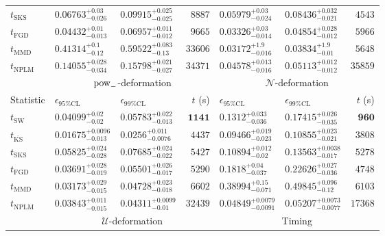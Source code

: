 \begin{tabular}{l|llr|llr}
	$t_{\mathrm{SKS}}$ & $0.06763_{-0.026}^{+0.03}$ & $0.09915_{-0.025}^{+0.025}$ & $8887$ & $0.05979_{-0.024}^{+0.03}$ & $0.08436_{-0.021}^{+0.032}$ & $4543$ \\
	$t_{\mathrm{FGD}}$ & ${\mathbf{0.04432_{-0.013}^{+0.01}}}$ & ${\mathbf{0.06957_{-0.012}^{+0.011}}}$ & $9665$ & $0.03326_{-0.014}^{+0.03}$ & $0.04854_{-0.012}^{+0.028}$ & $5966$ \\
	$t_{\mathrm{MMD}}$ & $0.41314_{-0.12}^{+0.1}$ & $0.59522_{-0.13}^{+0.083}$ & $33606$ & $0.03172_{-0.016}^{+1.9}$ & $0.03834_{-0.01}^{+1.9}$ & $5648$ \\
\rowcolor{red!35}	$t_{\mathrm{NPLM}}$ & $0.14055_{-0.034}^{+0.028}$ & $0.15798_{-0.027}^{+0.021}$ & $34371$ & $0.04578_{-0.016}^{+0.013}$ & $0.05113_{-0.012}^{+0.012}$ & $35859$ \\
	\toprule
	\multicolumn{1}{c}{} & \multicolumn{3}{c}{$\rm{pow}_{-}$-deformation} & \multicolumn{3}{c}{$\mathcal{N}$-deformation} \\
Statistic & $\epsilon_{95\%\mathrm{CL}}$ & $\epsilon_{99\%\mathrm{CL}}$ & $t$ (s) & $\epsilon_{95\%\mathrm{CL}}$ & $\epsilon_{99\%\mathrm{CL}}$ & $t$ (s) \\
	\midrule
	$t_{\mathrm{SW}}$ & $0.04099_{-0.02}^{+0.02}$ & $0.05783_{-0.013}^{+0.022}$ & ${\mathbf{1141}}$ & $0.1312_{-0.036}^{+0.033}$ & $0.17415_{-0.035}^{+0.026}$ & ${\mathbf{960}}$ \\
	$t_{\overline{\mathrm{KS}}}$ & ${\mathbf{0.01675_{-0.013}^{+0.0096}}}$ & ${\mathbf{0.0256_{-0.0076}^{+0.011}}}$ & $4437$ & ${\mathbf{0.09466_{-0.023}^{+0.019}}}$ & ${\mathbf{0.10855_{-0.021}^{+0.023}}}$ & $3808$ \\
	$t_{\mathrm{SKS}}$ & $0.05825_{-0.028}^{+0.024}$ & $0.07685_{-0.022}^{+0.024}$ & $5427$ & $0.10894_{-0.02}^{+0.012}$ & $0.13563_{-0.017}^{+0.0038}$ & $5278$ \\
	$t_{\mathrm{FGD}}$ & $0.03691_{-0.019}^{+0.028}$ & $0.05501_{-0.017}^{+0.026}$ & $5290$ & $0.1818_{-0.037}^{+0.04}$ & $0.22626_{-0.036}^{+0.027}$ & $4748$ \\
	$t_{\mathrm{MMD}}$ & $0.03173_{-0.015}^{+0.029}$ & $0.04728_{-0.018}^{+0.023}$ & $6602$ & $0.38994_{-0.071}^{+0.15}$ & $0.49845_{-0.12}^{+0.096}$ & $6103$ \\
\rowcolor{red!35}	$t_{\mathrm{NPLM}}$ & $0.03843_{-0.015}^{+0.011}$ & $0.04311_{-0.01}^{+0.0099}$ & $32439$ & $0.04849_{-0.0091}^{+0.0079}$ & $0.05207_{-0.0077}^{+0.0073}$ & $17368$ \\
	\toprule
	\multicolumn{1}{c}{} & \multicolumn{3}{c}{$\mathcal{U}$-deformation} & \multicolumn{3}{c}{Timing} \\

\end{tabular}
